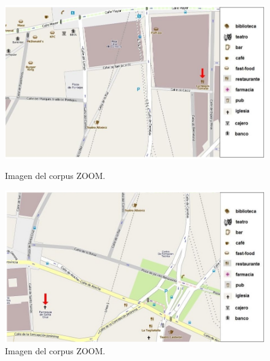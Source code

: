 \begin{figure}
\begin{minipage}[b]{0.5\linewidth}
\centering
\includegraphics[width=\textwidth]{images/corpus/mapa15.png}
\caption{Imagen del corpus ZOOM.}
\label{mapa15}
\end{minipage}
\hspace*{0cm}
\begin{minipage}[b]{0.5\linewidth}
\centering
\includegraphics[width=\textwidth]{images/corpus/mapa16.png}
\caption{Imagen del corpus ZOOM.}
\label{mapa16}
\end{minipage}
\end{figure}

